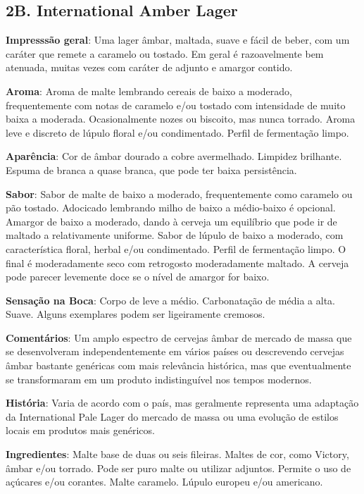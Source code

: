 \subsection*{2B. International Amber Lager}
\textbf{Impresssão geral}: Uma lager âmbar, maltada, suave e fácil de beber, com um caráter que remete a caramelo ou tostado. Em geral é razoavelmente bem atenuada, muitas vezes com caráter de adjunto e amargor contido.

\textbf{Aroma}: Aroma de malte lembrando cereais de baixo a moderado, frequentemente com notas de caramelo e/ou tostado com intensidade de muito baixa a moderada. Ocasionalmente nozes ou biscoito, mas nunca torrado. Aroma leve e discreto de lúpulo floral e/ou condimentado. Perfil de fermentação limpo.

\textbf{Aparência}: Cor de âmbar dourado a cobre avermelhado. Limpidez brilhante. Espuma de branca a quase branca, que pode ter baixa persistência.

\textbf{Sabor}: Sabor de malte de baixo a moderado, frequentemente como caramelo ou pão tostado. Adocicado lembrando milho de baixo a médio-baixo é opcional. Amargor de baixo a moderado, dando à cerveja um equilíbrio que pode ir de maltado a relativamente uniforme. Sabor de lúpulo de baixo a moderado, com característica floral, herbal e/ou condimentado. Perfil de fermentação limpo. O final é moderadamente seco com retrogosto moderadamente maltado. A cerveja pode parecer levemente doce se o nível de amargor for baixo.

\textbf{Sensação na Boca}: Corpo de leve a médio. Carbonatação de média a alta. Suave. Alguns exemplares podem ser ligeiramente cremosos.

\textbf{Comentários}: Um amplo espectro de cervejas âmbar de mercado de massa que se desenvolveram independentemente em vários países ou descrevendo cervejas âmbar bastante genéricas com mais relevância histórica, mas que eventualmente se transformaram em um produto indistinguível nos tempos modernos.

\textbf{História}: Varia de acordo com o país, mas geralmente representa uma adaptação da International Pale Lager do mercado de massa ou uma evolução de estilos locais em produtos mais genéricos.

\textbf{Ingredientes}: Malte base de duas ou seis fileiras. Maltes de cor, como Victory, âmbar e/ou torrado. Pode ser puro malte ou utilizar adjuntos. Permite o uso de açúcares e/ou corantes. Malte caramelo. Lúpulo europeu e/ou americano.

